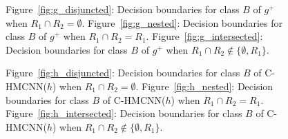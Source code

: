 \documentclass{article}
\newcommand{\system}[1]{C-HMCNN(#1)}
\begin{document}
\begin{figure}[h]
    \centering
     \caption{Figure~\ref{fig:g_disjuncted}: Decision boundaries for class $B$ of $g^+$ when $R_1 \cap R_2 = \emptyset$. Figure~\ref{fig:g_nested}: Decision boundaries for class $B$ of $g^+$ when $R_1 \cap R_2 = R_1$. Figure~\ref{fig:g_intersected}: Decision boundaries for class $B$ of $g^+$ when $R_1 \cap R_2 \not \in \{\emptyset, R_1\}$.}
\end{figure}

\begin{figure}[h]
    \centering
     \caption{Figure~\ref{fig:h_disjuncted}: Decision boundaries for class $B$ of \system{$h$} when $R_1 \cap R_2 = \emptyset$. Figure~\ref{fig:h_nested}: Decision boundaries for class $B$ of \system{$h$} when $R_1 \cap R_2 = R_1$. Figure~\ref{fig:h_intersected}: Decision boundaries for class $B$ of \system{$h$} when $R_1 \cap R_2 \not \in \{\emptyset, R_1\}$.}
\end{figure}
\end{document}
